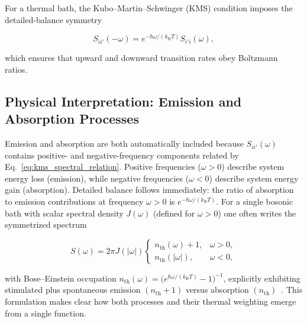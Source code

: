 \noindent
For a thermal bath, the Kubo--Martin--Schwinger (KMS) condition imposes the detailed-balance symmetry

\begin{equation}
	S_{ii'}(-\omega) = e^{-\hbar\omega/(k_{\mathrm{B}} T)} S_{i'i}(\omega),
	\label{eq:kms_spectral_relation}
\end{equation}

\noindent
which ensures that upward and downward transition rates obey Boltzmann ratios.

\subsection{Physical Interpretation: Emission and Absorption Processes}
\label{subsec:physical_emission_absorption}

\noindent
Emission and absorption are both automatically included because $S_{ii'}(\omega)$ contains positive- and negative-frequency components related by Eq.~\eqref{eq:kms_spectral_relation}. Positive frequencies ($\omega>0$) describe system energy loss (emission), while negative frequencies ($\omega<0$) describe system energy gain (absorption). Detailed balance follows immediately: the ratio of absorption to emission contributions at frequency $\omega>0$ is $e^{-\hbar \omega/(k_{\mathrm{B}}T)}$. For a single bosonic bath with scalar spectral density $J(\omega)$ (defined for $\omega>0$) one often writes the symmetrized spectrum

\begin{equation}
	S(\omega) = 2\pi J(|\omega|) \begin{cases} n_{\text{th}}(\omega)+1, & \omega>0, \\ n_{\text{th}}(|\omega|), & \omega<0, \end{cases}
	\label{eq:bose_symmetric_spectrum}
\end{equation}

\noindent
with Bose--Einstein occupation $n_{\text{th}}(\omega) = \big(e^{\hbar\omega/(k_{\mathrm{B}}T)}-1\big)^{-1}$, explicitly exhibiting stimulated plus spontaneous emission $(n_{\text{th}}+1)$ versus absorption $(n_{\text{th}})$~\cite{weiss2012quantumdissipativesystems}. This formulation makes clear how both processes and their thermal weighting emerge from a single function.


